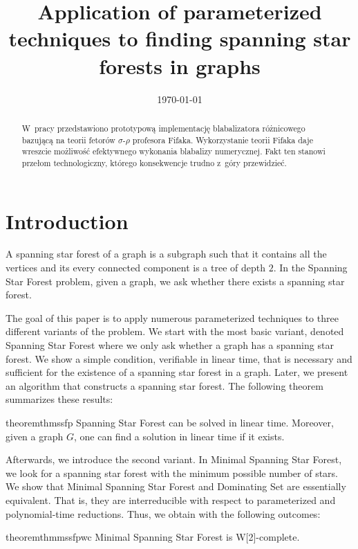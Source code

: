 \documentclass[en]{pracamgr}
\title{Application of parameterized techniques to finding spanning star forests in graphs}
\date{\monthyeardate\today}
\theoremstyle{definition}
\newcommand{\ssfp}{{\sc Spanning Star Forest}}
\newcommand{\mssfp}{{\sc Minimal Spanning Star Forest}}
\newcommand{\domsetp}{{\sc Dominating Set}}
\begin{document}
\maketitle

\begin{abstract}
  W~pracy przedstawiono prototypową implementację blabalizatora
  różnicowego bazującą na teorii fetorów $\sigma$-$\rho$ profesora
  Fifaka.  Wykorzystanie teorii Fifaka daje wreszcie możliwość
  efektywnego wykonania blabalizy numerycznej.  Fakt ten stanowi
  przełom technologiczny, którego konsekwencje trudno z~góry
  przewidzieć.
\end{abstract}

\tableofcontents

\chapter{Introduction}

A spanning star forest of a graph is a subgraph such that it contains all the vertices and its every connected component is a tree of depth $2$. In the \ssfp{} problem, given a graph, we ask whether there exists a spanning star forest. 

The goal of this paper is to apply numerous parameterized techniques to three different variants of the problem. We start with the most basic variant, denoted \ssfp{} where we only ask whether a graph has a spanning star forest. We show a simple condition, verifiable in linear time, that is necessary and sufficient for the existence of a spanning star forest in a graph. Later, we present an algorithm that constructs a spanning star forest. The following theorem summarizes these results:

\begin{restatable}{theorem}{thmssfp}\label{thm-ssfp}
	\ssfp{} can be solved in linear time. Moreover, given a graph $G$, one can find a solution in linear time if it exists.
\end{restatable}

Afterwards, we introduce the second variant. In \mssfp{}, we look for a spanning star forest with the minimum possible number of stars. We show that \mssfp{} and \domsetp{} are essentially equivalent. That is, they are interreducible with respect to parameterized and polynomial-time reductions. Thus, we obtain with the following outcomes:

\begin{restatable}{theorem}{thmmssfpwc}\label{thm-mssfp-w2c}
	\mssfp{} is \textup{W[2]}-complete.
\end{restatable}
\end{document}
